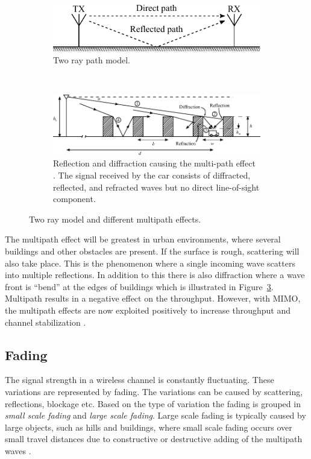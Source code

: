 \begin{figure}[htbp]
    \centering
    \begin{subfigure}[b]{0.6\textwidth} 
        \centering
        \includegraphics{img/analysis/tworay}
        \caption{Two ray path model.}
        \label{fig:mul_tworay}
    \end{subfigure}
    \\
    \begin{subfigure}[b]{0.7\textwidth} 
        \centering
        \includegraphics{img/analysis/parsons_multipath}
        \caption{Reflection and diffraction causing the multi-path effect \cite{parsons2000mobile}. The signal received by the car consists of diffracted, reflected, and refracted waves but no direct line-of-sight component.}
        \label{fig:mul_reflec_diffrac}
    \end{subfigure}
    \caption{Two ray model and different multipath effects.}
\end{figure}

The multipath effect will be greatest in urban environments, where several buildings and other obstacles are present. If the surface is rough, scattering will also take place. This is the phenomenon where a single incoming wave scatters into multiple reflections. In addition to this there is also diffraction where a wave front is ``bend'' at the edges of buildings which is illustrated in Figure~\ref{fig:mul_reflec_diffrac}. Multipath results in a negative effect on the throughput. However, with MIMO, the multipath effects are now exploited positively to increase throughput and channel stabilization \cite{parsons2000mobile}.

\subsection{Fading}
The signal strength in a wireless channel is constantly fluctuating. These variations are represented by fading. The variations can be caused by scattering, reflections, blockage etc. Based on the type of variation the fading is grouped in \emph{small scale fading} and \emph{large scale fading}. Large scale fading is typically caused by large objects, such as hills and buildings, where small scale fading occurs over small travel distances due to constructive or destructive adding of the multipath waves \cite{parsons2000mobile}.

